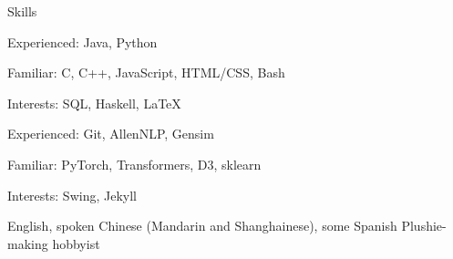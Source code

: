 
\begin{rubric}{Skills}
    \par Experienced: Java, Python
    \par Familiar: C, C++, JavaScript, HTML/CSS, Bash
    \par Interests: SQL, Haskell, \LaTeX
{}
    \par Experienced: Git, AllenNLP, Gensim
    \par Familiar: PyTorch, Transformers, D3, sklearn
    \par Interests: Swing, Jekyll
    \par English, spoken Chinese (Mandarin and Shanghainese), some Spanish
\entry*[Misc.]
    Plushie-making hobbyist
\end{rubric}
